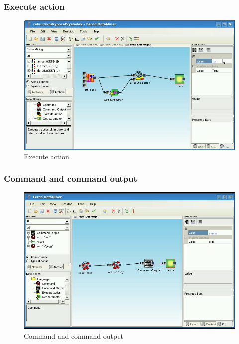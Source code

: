 \documentclass[a4paper,12pt]{book}
\begin{document}
\subsubsection{Execute action}
\begin{figure}
\includegraphics[width=13.72cm]{executeAction2.png}
	\caption{Execute action}
\end{figure}

\subsubsection{Command and command output}
\begin{figure}
	\includegraphics[width=13.72cm]{command2.png}
	\caption{Command and command output}
\end{figure}
\end{document}
